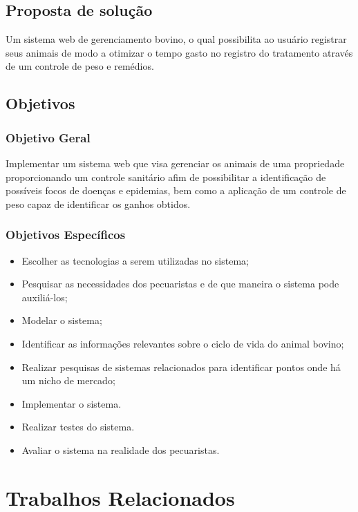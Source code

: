 \documentclass[12pt]{article}
\begin{document}
\subsection{Proposta de solução}

Um sistema web de gerenciamento bovino, o qual possibilita ao usuário registrar seus animais de modo a otimizar o tempo gasto no registro do tratamento através de um controle de peso e remédios.

\subsection{Objetivos}

\subsubsection{Objetivo Geral}

Implementar um sistema web que visa gerenciar os animais de uma propriedade proporcionando um controle sanitário afim de possibilitar a identificação de possíveis focos de doenças e epidemias, bem como a aplicação de um controle de peso capaz de identificar os ganhos obtidos.

\subsubsection{Objetivos Específicos}

\begin{itemize}
	\item Escolher as tecnologias a serem utilizadas no sistema;
	\item Pesquisar as necessidades dos pecuaristas e de que maneira o sistema pode auxiliá-los;
	\item Modelar o sistema;
	\item Identificar as informações relevantes sobre o ciclo de vida do animal bovino;
	\item Realizar pesquisas de sistemas relacionados para identificar pontos onde há um nicho de mercado;
	\item Implementar o sistema.
	\item Realizar testes do sistema.
	\item Avaliar o sistema na realidade dos pecuaristas.
\end{itemize}

\section{Trabalhos Relacionados}
\end{document}
